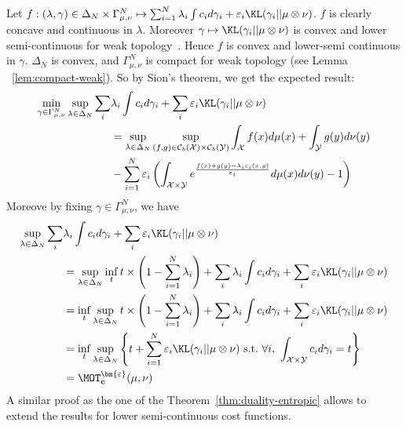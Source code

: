 \begin{prv*}
Let $f: (\lambda,\gamma)\in\Delta_N\times\Gamma^N_{\mu,\nu}\mapsto\sum_{i=1}^N \lambda_i\int c_i d\gamma_i + \varepsilon_i \KL(\gamma_i||\mu\otimes\nu)$. $f$ is clearly concave and continuous in $\lambda$. Moreover $\gamma\mapsto \KL(\gamma_i||\mu\otimes\nu)$ is convex and lower semi-continuous for weak topology~\citep[Lemma 1.4.3]{dupuis2011weak}. Hence $f$ is convex and lower-semi continuous in $\gamma$. $\Delta_N$ is  convex, and  $\Gamma^N_{\mu,\nu}$ is compact for weak topology (see  Lemma
~\ref{lem:compact-weak}). So by Sion's theorem,  we get the expected  result:
\begin{align*}
\min_{\gamma\in\Gamma^N_{\mu,\nu}} \sup_{\lambda\in\Delta_N}\sum_{i}&\lambda_i \int c_i d\gamma_i + \sum_i\varepsilon_i \KL(\gamma_i||\mu\otimes\nu)\\
&=\sup_{\lambda\in\Delta_N} \sup_{(f,g)\in\mathcal{C}_b(\mathcal{X})\times\mathcal{C}_b(\mathcal{Y})}\int_{\mathcal{X}} f(x)d\mu(x)+ \int_{\mathcal{Y}} g(y)d\nu(y)\\
&-\sum_{i=1}^N\varepsilon_i\left( \int_{\mathcal{X}\times\mathcal{Y}} e^{\frac{f(x)+g(y)-\lambda_ic_i(x,y)}{\varepsilon_i}} d\mu(x)d\nu(y)-1\right)
\end{align*}
Moreove by fixing $\gamma\in\Gamma^N_{\mu,\nu}$, we have
\begin{align*}
\sup_{\lambda\in\Delta_N}\sum_{i}&\lambda_i \int c_i d\gamma_i + \sum_i\varepsilon_i \KL(\gamma_i||\mu\otimes\nu)\\
&=\sup_{\lambda\in\Delta_N} \inf_t t\times\left(1-\sum_{i=1}^N \lambda_i \right) +\sum_{i}\lambda_i \int c_i d\gamma_i + \sum_i\varepsilon_i \KL(\gamma_i||\mu\otimes\nu)\\
&= \inf_t \sup_{\lambda\in\Delta_N}  t\times\left(1-\sum_{i=1}^N \lambda_i \right) +\sum_{i}\lambda_i \int c_i d\gamma_i + \sum_i\varepsilon_i \KL(\gamma_i||\mu\otimes\nu)\\
&= \inf_t \sup_{\lambda\in\Delta_N}  \left\{t +\sum_{i=1}^N \varepsilon_i\KL(\gamma_i||\mu\otimes \nu) ~ \mathrm{ s.t.}~\forall i, ~ \int_{\mathcal{X}\times\mathcal{Y}}c_id\gamma_i = t\right\}\\
&=\MOT_{\mathbf{c}}^{\bm{\varepsilon}}(\mu,\nu)
\end{align*}
A similar proof as the one of the Theorem~\ref{thm:duality-entropic} allows to extend the results for lower semi-continuous cost functions.
\end{prv*}








